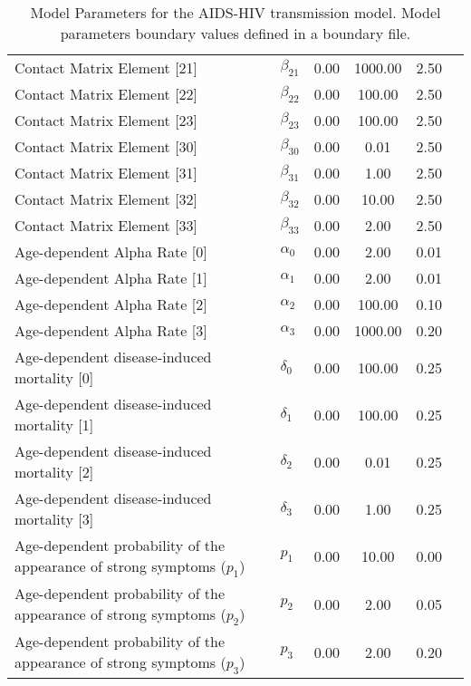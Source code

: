 \begin{table}
\begin{tabular}{p{5cm}lcccc}
Contact Matrix Element [21] & $\beta_{21}$ & 0.00 & 1000.00 & 2.50\\
Contact Matrix Element [22] & $\beta_{22}$ & 0.00 & 100.00 & 2.50\\
Contact Matrix Element [23] & $\beta_{23}$ & 0.00 & 100.00 & 2.50\\
Contact Matrix Element [30] & $\beta_{30}$ & 0.00 & 0.01 & 2.50\\
Contact Matrix Element [31] & $\beta_{31}$ & 0.00 & 1.00 & 2.50\\
Contact Matrix Element [32] & $\beta_{32}$ & 0.00 & 10.00 & 2.50\\
Contact Matrix Element [33] & $\beta_{33}$ & 0.00 & 2.00 & 2.50\\
Age-dependent Alpha Rate [0] & $\alpha_0$ & 0.00 & 2.00 & 0.01\\
Age-dependent Alpha Rate [1] & $\alpha_1$ & 0.00 & 2.00 & 0.01\\
Age-dependent Alpha Rate [2] & $\alpha_2$ & 0.00 & 100.00 & 0.10\\
Age-dependent Alpha Rate [3] & $\alpha_3$ & 0.00 & 1000.00 & 0.20\\
Age-dependent disease-induced mortality [0] & $\delta_0$ & 0.00 & 100.00 & 0.25\\
Age-dependent disease-induced mortality [1] & $\delta_1$ & 0.00 & 100.00 & 0.25\\
Age-dependent disease-induced mortality [2] & $\delta_2$ & 0.00 & 0.01 & 0.25\\
Age-dependent disease-induced mortality [3] & $\delta_3$ & 0.00 & 1.00 & 0.25\\
Age-dependent probability of the appearance of strong symptoms ($p_1$) & $p_1$ & 0.00 & 10.00 & 0.00\\
Age-dependent probability of the appearance of strong symptoms ($p_2$) & $p_2$ & 0.00 & 2.00 & 0.05\\
Age-dependent probability of the appearance of strong symptoms ($p_3$) & $p_3$ & 0.00 & 2.00 & 0.20\\
\hline\hline
\end{tabular}
\caption{Model Parameters for the AIDS-HIV transmission model. Model parameters boundary values defined in a boundary file.}
\end{table}
